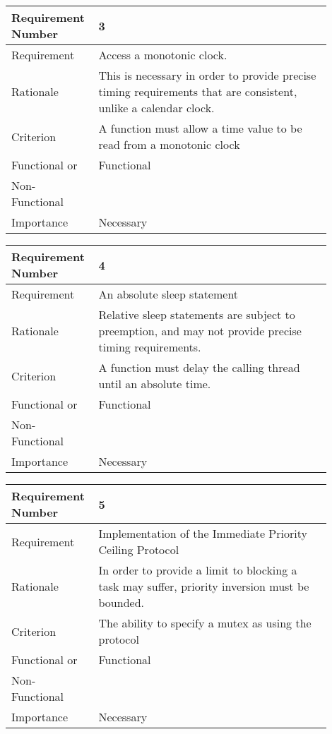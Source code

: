 \begin{table}[!htbp]
\centering
\begin{tabular}{|L{0.2\linewidth}|L{0.7\linewidth}|}
\hline
Requirement Number & 3 \\ \hline
Requirement & Access a monotonic clock. \\ \hline
Rationale      & This is necessary in order to provide precise timing requirements 
                that are consistent, unlike a calendar clock. \\ \hline
Criterion      & A function must allow a time value to be read from a monotonic clock \\ \hline
Functional or  & Functional \\
Non-Functional & \\ \hline
Importance     & Necessary \\ \hline
\end{tabular}
\end{table}
\begin{table}[!htbp]
\centering
\begin{tabular}{|L{0.2\linewidth}|L{0.7\linewidth}|}
\hline
Requirement Number & 4 \\ \hline
Requirement & An absolute sleep statement \\ \hline
Rationale      & Relative sleep statements are subject to preemption, and may not 
                provide precise timing requirements. \\ \hline
Criterion      & A function must delay the calling thread until an absolute time. \\ \hline
Functional or  & Functional \\
Non-Functional & \\ \hline
Importance     & Necessary \\ \hline
\end{tabular}
\end{table}
\begin{table}[!htbp]
\centering
\begin{tabular}{|L{0.2\linewidth}|L{0.7\linewidth}|}
\hline
Requirement Number & 5 \\ \hline
Requirement & Implementation of the Immediate Priority Ceiling Protocol \\ \hline
Rationale      & In order to provide a limit to blocking a task may suffer, priority 
                inversion must be bounded. \\ \hline
Criterion      & The ability to specify a mutex as using the protocol\\ \hline
Functional or  & Functional \\
Non-Functional & \\ \hline
Importance     & Necessary \\ \hline
\end{tabular}
\end{table}
